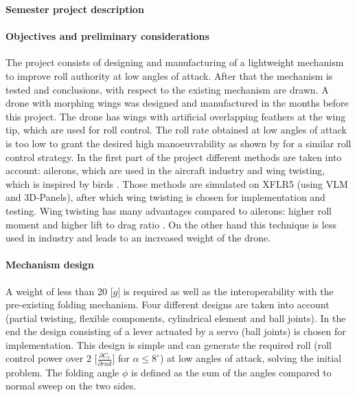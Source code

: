 \documentclass[12pt,a4paper]{article}
\begin{document}
\restoregeometry %
\nopagecolor%
\begin{center}
\textbf{\Large{Semester project description}}\\
\end{center}
\begin{multicols}{2}
[]

\paragraph{Objectives and preliminary considerations} 
\lfoot{\today}
The project consists of designing and manufacturing of a lightweight mechanism to improve roll authority at low angles of attack. After that the mechanism is tested and conclusions, with respect to the existing mechanism are drawn.
A drone with morphing wings was designed and manufactured in the months before this project. The drone has wings with artificial overlapping feathers at the wing tip, which are used for roll control. The roll rate obtained at low angles of attack is too low to grant the desired high manoeuvrability as shown by \cite{ref6} for a similar roll control strategy. In the first part of the project different methods are taken into account: ailerons, which are used in the aircraft industry and wing twisting, which is inspired by birds \cite{bird}. Those methods are simulated on XFLR5 (using VLM and 3D-Panels), after which wing twisting is chosen for implementation and testing. Wing twisting has many advantages compared to ailerons: higher roll moment \cite{real_plane} and higher lift to drag ratio \cite{ref3}. On the other hand this technique is less used in industry and leads to an increased weight of the drone. 
\paragraph{Mechanism design}
 A weight of less than 20 [$g$] is required as well as the interoperability with the pre-existing folding mechanism. Four different designs are taken into account (partial twisting, flexible components, cylindrical element and ball joints). In the end the design consisting of a lever actuated by a servo (ball joints) is chosen for implementation. This design is simple and can generate the required roll (roll control power over 2 [$\frac{\partial C_r}{\partial rad}$] for $\alpha \leq 8^\circ$) at low angles of attack, solving the initial problem. The folding angle $\phi$ is defined as the sum of the angles compared to normal sweep on the two sides. 

\end{multicols}
\end{document}
